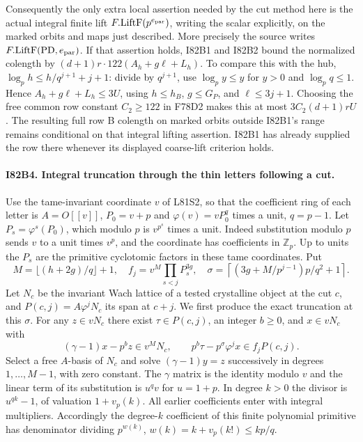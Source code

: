 Consequently the only extra local assertion needed by the cut
method here is the actual integral finite lift
$F.\mathrm{LiftF}(p^{e_{\rm par}})$, writing the scalar explicitly,
on the marked orbits and maps just described. More precisely the
source writes $F.\mathrm{LiftF}(\mathrm{PD},e_{\rm par})$. If
that assertion holds, I82B1 and I82B2 bound the normalized
colength by $(d+1)r\cdot122(A_h+g\ell+L_h)$. To compare this
with the hub, $\log_p h\le h/q^{j+1}+j+1$: divide by $q^{j+1}$,
use $\log_p y\le y$ for $y>0$ and $\log_p q\le1$. Hence
$A_h+g\ell+L_h\le3U$, using $h\le h_B$, $g\le G_P$,
and $\ell\le3j+1$. Choosing the free common row constant
$C_2\ge122$ in F78D2 makes this at most $3C_2(d+1)rU$.
The resulting full row B colength on marked orbits outside
I82B1's range remains conditional on that integral lifting
assertion. I82B1 has already supplied the row there whenever
its displayed coarse-lift criterion holds.

\paragraph{I82B4. Integral truncation through the thin letters following a cut.}
Use the tame-invariant coordinate $v$ of L81S2, so that the
coefficient ring of each letter is $A=O[[v]]$,
$P_0=v+p$ and $\varphi(v)=vP_0^q$ times a unit, $q=p-1$.
Let $P_s=\varphi^s(P_0)$, which modulo $p$ is $v^{p^s}$
times a unit. Indeed substitution modulo $p$ sends $v$ to a
unit times $v^p$, and the coordinate has coefficients in
$\mathbb Z_p$. Up to units the $P_s$ are the primitive
cyclotomic factors in these tame coordinates. Put
\[
 M=\lfloor(h+2g)/q\rfloor+1,\quad
 f_j=v^M\prod_{s<j}P_s^{3g},\quad
 \sigma=\left\lceil(3g+M/p^{j-1})p/q^2+1\right\rceil .
\]
Let $N_c$ be the invariant Wach lattice of a tested crystalline
object at the cut $c$, and $P(c,j)=A\varphi^j N_c$ its span at
$c+j$. We first produce the exact truncation at this $\sigma$.
For any $z\in vN_c$ there exist $\tau\in P(c,j)$, an integer
$b\ge0$, and $x\in vN_c$ with
\[
  (\gamma-1)x-p^bz\in v^MN_c,\qquad
  p^b\tau-p^\sigma\varphi^j x\in f_j P(c,j).
\]
Select a free $A$-basis of $N_c$ and solve $(\gamma-1)y=z$
successively in degrees $1,\ldots,M-1$, with zero constant.
The $\gamma$ matrix is the identity modulo $v$ and the linear
term of its substitution is $u^q v$ for $u=1+p$. In degree
$k>0$ the divisor is $u^{qk}-1$, of valuation $1+v_p(k)$.
All earlier coefficients enter with integral multipliers.
Accordingly the degree-$k$ coefficient of this finite polynomial
primitive has denominator dividing $p^{w(k)}$,
$w(k)=k+v_p(k!)\le kp/q$.

